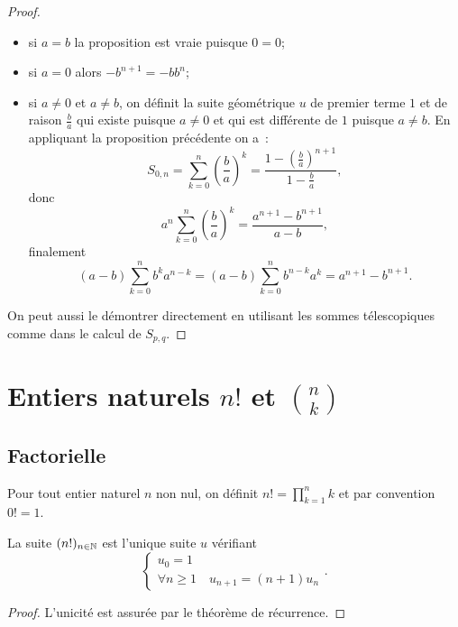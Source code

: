 \begin{proof}
  \begin{itemize}
  \item si $a=b$ la proposition est vraie puisque $0=0$;
  \item si $a=0$ alors $-b^{n+1}=-b b^n$;
  \item si $a\neq 0$ et $a\neq b$, on définit la suite géométrique $u$ de premier terme $1$ et de raison $\frac{b}{a}$ qui existe puisque $a\neq 0$ et qui est différente de $1$ puisque $a\neq b$. En appliquant la proposition précédente on a~: 
\begin{equation}
  S_{0,n}=\sum_{k=0}^n\left(\frac{b}{a}\right)^k=\frac{1-\left(\frac{b}{a}\right)^{n+1}}{1-\frac{b}{a}},
\end{equation}
donc
\begin{equation}
  a^n \sum_{k=0}^n\left(\frac{b}{a}\right)^k = \frac{a^{n+1}-b^{n+1}}{a-b},
\end{equation}
finalement
\begin{equation}
  (a-b)\sum_{k=0}^n b^ka^{n-k}=(a-b)\sum_{k=0}^n b^{n-k}a^{k}=a^{n+1}-b^{n+1}.
\end{equation}
\end{itemize}
On peut aussi le démontrer directement en utilisant les sommes télescopiques comme dans le calcul de $S_{p,q}$.
\end{proof}

\section{Entiers naturels $n!$ et $\binom{n}{k}$}

\subsection{Factorielle}

\begin{defdef}
  Pour tout entier naturel $n$ non nul, on définit $n!=\prod_{k=1}^n k$ et par convention $0!=1$.
\end{defdef}
\begin{prop}
  La suite $(n!)_{n\in\mathbb{N}}$ est l'unique suite $u$ vérifiant
  \begin{equation}
    \begin{cases}
      u_0=1 \\
      \forall n\geqslant 1 \quad u_{n+1}=(n+1) u_n
    \end{cases}.
  \end{equation}
\end{prop}
\begin{proof}
  L'unicité est assurée par le théorème de récurrence.
\end{proof}

